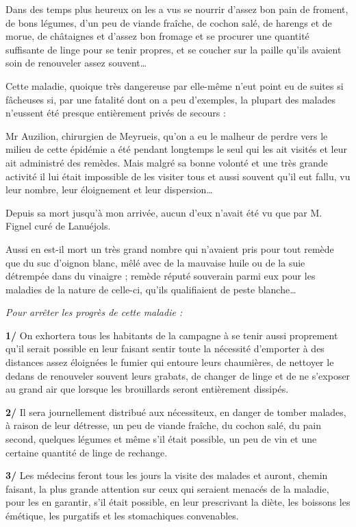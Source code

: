 {\fontsize{10.2}{12.0}\selectfont

Dans des temps plus heureux on les a vus se nourrir d’assez bon pain de froment, de bons légumes, d’un peu de viande fraîche, de cochon salé, de harengs et de morue, de châtaignes et d’assez bon fromage et se procurer une quantité suffisante de linge pour se tenir propres, et se coucher sur la paille qu’ils avaient soin de renouveler assez souvent…

Cette maladie, quoique très dangereuse par elle-même n’eut point eu de suites si fâcheuses si, par une fatalité dont on a peu d’exemples, la plupart des malades n’eussent été presque entièrement privés de secours :

Mr Auzilion, chirurgien de Meyrueis, qu’on a eu le malheur de perdre vers le milieu de cette épidémie a été pendant longtemps le seul qui les ait visités et leur ait administré des remèdes. Mais malgré sa bonne volonté et une très grande activité il lui était impossible de les visiter tous et aussi souvent qu’il eut fallu, vu leur nombre, leur éloignement et leur dispersion…

Depuis sa mort jusqu’à mon arrivée, aucun d’eux n’avait été vu que par M. Fignel curé de Lanuéjols.

Aussi en est-il mort un très grand nombre qui n’avaient pris pour tout remède que du suc d’oignon blanc, mêlé avec de la mauvaise huile ou de la suie détrempée dans du vinaigre ; remède réputé souverain parmi eux pour les maladies de la nature de celle-ci, qu’ils qualifiaient de peste blanche…

\medskip
\textit{Pour arrêter les progrès de cette maladie :}

\textbf{1/} On exhortera tous les habitants de la campagne à se tenir aussi proprement qu’il serait possible en leur faisant sentir toute la nécessité d’emporter à des distances assez éloignées le fumier qui entoure leurs chaumières, de nettoyer le dedans de renouveler souvent leurs grabats, de changer de linge et de ne s’exposer au grand air que lorsque les brouillards seront entièrement dissipés.

\textbf{2/} Il sera journellement distribué aux nécessiteux, en danger de tomber malades, à raison de leur détresse, un peu de viande fraîche, du cochon salé, du pain second, quelques légumes et même s’il était possible, un peu de vin et une certaine quantité de linge de rechange.

\textbf{3/} Les médecins feront tous les jours la visite des malades et auront, chemin faisant, la plus grande attention sur ceux qui seraient menacés de la maladie, pour les en garantir, s’il était possible, en leur prescrivant la diète, les boissons les émétique, les purgatifs et les stomachiques convenables.

}
